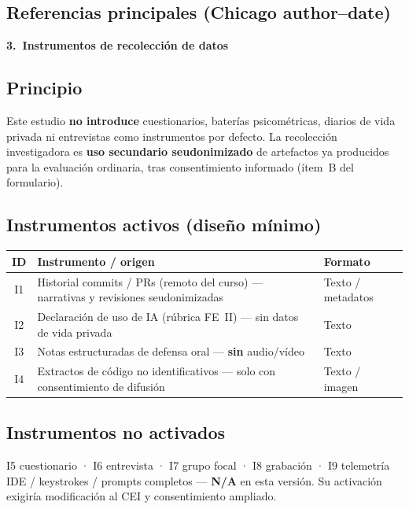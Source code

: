 \documentclass[11pt,a4paper]{scrartcl}
\newcommand{\AnnexTitle}[1]{%
  \clearpage
  \LogoRow
  \begin{center}{\Large\sffamily\bfseries #1}\end{center}
  \vspace{0.4em}
  \noindent{\color{rulegray}\hrule height 0.4pt}
  \vspace{0.5em}
}
\begin{document}
\subsection*{Referencias principales (Chicago author--date)}
\ChicagoMethodsRefs

\AnnexTitle{3.\ Instrumentos de recolección de datos}

\subsection*{Principio}
Este estudio \textbf{no introduce} cuestionarios, baterías psicométricas, diarios
de vida privada ni entrevistas como instrumentos por defecto. La recolección
investigadora es \textbf{uso secundario seudonimizado} de artefactos ya producidos
para la evaluación ordinaria, tras consentimiento informado (ítem~B del formulario).

\subsection*{Instrumentos activos (diseño mínimo)}
\renewcommand{\arraystretch}{1.25}
\begin{tabularx}{\textwidth}{@{}c>{\raggedright\arraybackslash}X>{\raggedright\arraybackslash}p{3.2cm}@{}}
  \toprule
  \textbf{ID} & \textbf{Instrumento / origen} & \textbf{Formato} \\
  \midrule
  I1 & Historial commits / PRs (remoto del curso) --- narrativas y revisiones seudonimizadas & Texto / metadatos \\
  I2 & Declaración de uso de IA (rúbrica FE~II) --- sin datos de vida privada & Texto \\
  I3 & Notas estructuradas de defensa oral --- \textbf{sin} audio/vídeo & Texto \\
  I4 & Extractos de código no identificativos --- solo con consentimiento de difusión & Texto / imagen \\
  \bottomrule
\end{tabularx}

\subsection*{Instrumentos no activados}
I5 cuestionario · I6 entrevista · I7 grupo focal · I8 grabación · I9 telemetría IDE /
keystrokes / prompts completos --- \textbf{N/A} en esta versión. Su activación
exigiría modificación al CEI y consentimiento ampliado.
\end{document}
